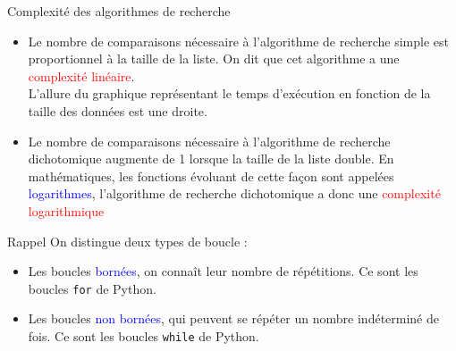 \documentclass[10pt]{beamer}
\begin{document}
\begin{frame}
	\mframe{\NA}
	\begin{block}{Complexité des algorithmes de recherche}
		\begin{itemize}[label=\textbullet]
			\item<2-> Le nombre de comparaisons nécessaire à l'algorithme de recherche simple est proportionnel à la taille de la liste. 
			\onslide<3->On dit que cet algorithme a une \textcolor{red}{complexité linéaire}.\\
			\onslide<4->L'allure du graphique représentant le temps d'exécution en fonction de la taille des données est une droite.
			\item<5-> Le nombre de comparaisons nécessaire à l'algorithme de recherche dichotomique augmente de 1 lorsque la taille de la liste double.
			\onslide<6-> En mathématiques, les fonctions évoluant de cette façon sont appelées \textcolor{blue}{logarithmes}, l'algorithme de recherche dichotomique a donc une \textcolor{red}{complexité logarithmique}
		\end{itemize}
	\end{block}	
\end{frame}


\begin{frame}
	\mframe{\NA}
	\begin{block}{\textcolor{yellow}{\rappel\;} Rappel}
		On distingue deux types de boucle :
		\begin{itemize}[label=\textbullet]
			\item<2-> Les boucles \textcolor{blue}{bornées}, on connaît leur nombre de répétitions. Ce sont les boucles \texttt{for} de Python.
			\item<3-> Les boucles \textcolor{blue}{non bornées}, qui peuvent se répéter un nombre indéterminé de fois. Ce sont les boucles \texttt{while} de Python.
		\end{itemize}
	\end{block}
\end{frame}
\end{document}
